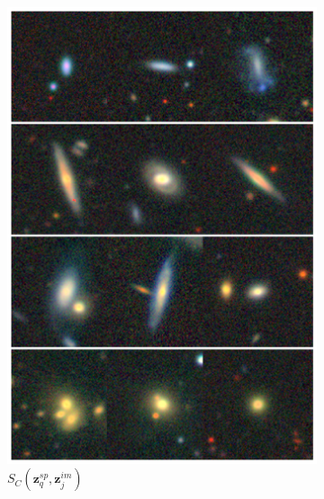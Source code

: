 \documentclass[a4paper,12pt]{article}
\begin{document}
\begin{figure}[H]
\begin{subfigure}{0.22\textwidth}
        \includegraphics[height=0.21\textheight]{../figures/images_im_sp.png}
        \caption{$S_C(\mathbf{z}_q^{sp}, \mathbf{z}_j^{im})$}
        \label{fig:retrieval_4}
    \end{subfigure}%
    \hfill
    \begin{subfigure}{0.22\textwidth}
        \centering

\end{subfigure}
\end{figure}
\end{document}
